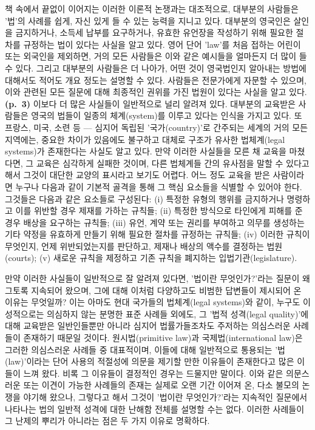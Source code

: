 \documentclass[12pt, oneside]{book}  %
\begin{document}
책 속에서 끝없이 이어지는 이러한 이론적 논쟁과는 대조적으로, 대부분의
사람들은 '법'의 사례를 쉽게, 자신 있게 들 수 있는 능력을 지니고 있다.
대부분의 영국인은 살인을 금지하거나, 소득세 납부를 요구하거나, 유효한
유언장을 작성하기 위해 필요한 절차를 규정하는 법이 있다는 사실을 알고
있다. 영어 단어 'law'를 처음 접하는 어린이 또는 외국인을 제외하면, 거의
모든 사람들은 이와 같은 예시들을 얼마든지 더 많이 들 수 있다. 그리고
대부분의 사람들은 더 나아가, 어떤 것이 영국법인지 알아내는 방법에
대해서도 적어도 개요 정도는 설명할 수 있다. 사람들은 전문가에게 자문할
수 있으며, 이와 관련된 모든 질문에 대해 최종적인 권위를 가진 법원이
있다는 사실을 알고 있다. \textbf{(p.~3)} 이보다 더 많은 사실들이
일반적으로 널리 알려져 있다. 대부분의 교육받은 사람들은 영국의 법들이
일종의 체계(system)를 이루고 있다는 인식을 가지고 있다. 또 프랑스, 미국,
소련 등 --- 심지어 독립된 '국가(country)'로 간주되는 세계의 거의 모든
지역에는, 중요한 차이가 있음에도 불구하고 대체로 구조가 유사한
법체계(legal systems)가 존재한다는 사실도 알고 있다. 만약 이러한
사실들을 모른 채 교육을 마쳤다면, 그 교육은 심각하게 실패한 것이며, 다른
법체계들 간의 유사점을 말할 수 있다고 해서 그것이 대단한 교양의 표시라고
보기도 어렵다. 어느 정도 교육을 받은 사람이라면 누구나 다음과 같이
기본적 골격을 통해 그 핵심 요소들을 식별할 수 있어야 한다. 그것들은
다음과 같은 요소들로 구성된다: (i) 특정한 유형의 행위를 금지하거나
명령하고 이를 위반할 경우 제재를 가하는 규칙들; (ii) 특정한 방식으로
타인에게 피해를 준 경우 배상을 요구하는 규칙들; (iii) 유언, 계약 또는
권리를 부여하고 의무를 생성하는 기타 약정을 유효하게 만들기 위해 필요한
절차를 규정하는 규칙들; (iv) 이러한 규칙이 무엇인지, 언제 위반되었는지를
판단하고, 제재나 배상의 액수를 결정하는 법원(courts); (v) 새로운 규칙을
제정하고 기존 규칙을 폐지하는 입법기관(legislature).

만약 이러한 사실들이 일반적으로 잘 알려져 있다면, '법이란 무엇인가?'라는
질문이 왜 그토록 지속되어 왔으며, 그에 대해 이처럼 다양하고도 비범한
답변들이 제시되어 온 이유는 무엇일까? 이는 아마도 현대 국가들의
법체계(legal systems)와 같이, 누구도 이성적으로는 의심하지 않는 분명한
표준 사례들 외에도, 그 '법적 성격(legal quality)'에 대해 교육받은
일반인들뿐만 아니라 심지어 법률가들조차도 주저하는 의심스러운 사례들이
존재하기 때문일 것이다. 원시법(primitive law)과 국제법(international
law)은 그러한 의심스러운 사례들 중 대표적이며, 이들에 대해 일반적으로
통용되는 '법(law)'이라는 단어 사용의 적절성에 의문을 제기할 만한
이유들이 존재한다고 많은 이들이 느껴 왔다. 비록 그 이유들이 결정적인
경우는 드물지만 말이다. 이와 같은 의문스러운 또는 이견이 가능한 사례들의
존재는 실제로 오랜 기간 이어져 온, 다소 불모의 논쟁을 야기해 왔으나,
그렇다고 해서 그것이 '법이란 무엇인가?'라는 지속적인 질문에서 나타나는
법의 일반적 성격에 대한 난해함 전체를 설명할 수는 없다. 이러한 사례들이
그 난제의 뿌리가 아니라는 점은 두 가지 이유로 명확하다.
\end{document}
